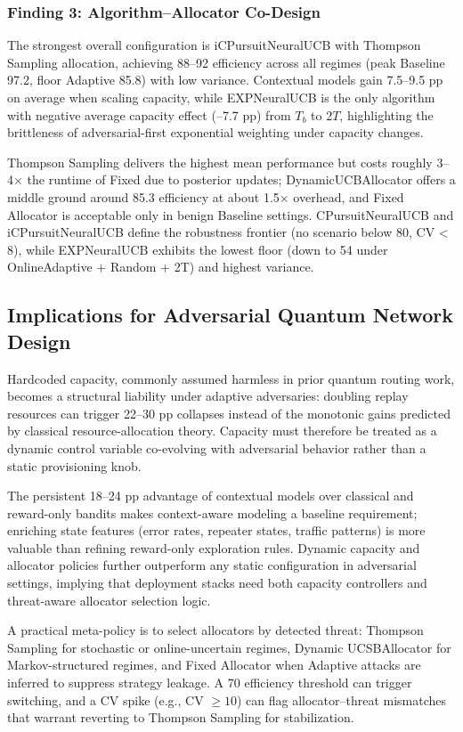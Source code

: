 \documentclass[11pt,a4paper]{article}
\begin{document}
\subsubsection{Finding 3: Algorithm--Allocator Co-Design}

The strongest overall configuration is iCPursuitNeuralUCB with Thompson Sampling allocation, achieving 88--92 efficiency across all regimes (peak Baseline 97.2, floor Adaptive 85.8) with low variance. Contextual models gain 7.5--9.5 pp on average when scaling capacity, while EXPNeuralUCB is the only algorithm with negative average capacity effect (--7.7 pp) from $T_b$ to $2T$, highlighting the brittleness of adversarial-first exponential weighting under capacity changes.

Thompson Sampling delivers the highest mean performance but costs roughly 3--4× the runtime of Fixed due to posterior updates; DynamicUCBAllocator offers a middle ground around 85.3 efficiency at about 1.5× overhead, and Fixed Allocator is acceptable only in benign Baseline settings. CPursuitNeuralUCB and iCPursuitNeuralUCB define the robustness frontier (no scenario below 80, CV < 8), while EXPNeuralUCB exhibits the lowest floor (down to 54 under OnlineAdaptive + Random + 2T) and highest variance.

\subsection{Implications for Adversarial Quantum Network Design}

Hardcoded capacity, commonly assumed harmless in prior quantum routing work, becomes a structural liability under adaptive adversaries: doubling replay resources can trigger 22--30 pp collapses instead of the monotonic gains predicted by classical resource-allocation theory. Capacity must therefore be treated as a dynamic control variable co-evolving with adversarial behavior rather than a static provisioning knob.

The persistent 18--24 pp advantage of contextual models over classical and reward-only bandits makes context-aware modeling a baseline requirement; enriching state features (error rates, repeater states, traffic patterns) is more valuable than refining reward-only exploration rules. Dynamic capacity and allocator policies further outperform any static configuration in adversarial settings, implying that deployment stacks need both capacity controllers and threat-aware allocator selection logic.

A practical meta-policy is to select allocators by detected threat: Thompson Sampling for stochastic or online-uncertain regimes, Dynamic UCSBAllocator for Markov-structured regimes, and Fixed Allocator when Adaptive attacks are inferred to suppress strategy leakage. A 70 efficiency threshold can trigger switching, and a CV spike (e.g., CV $\geq 10$) can flag allocator--threat mismatches that warrant reverting to Thompson Sampling for stabilization.
\end{document}
